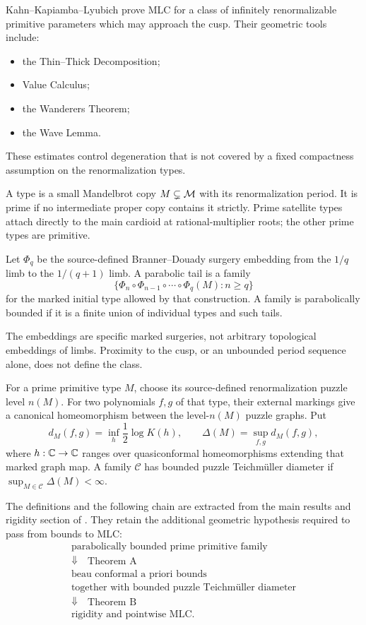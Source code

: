 Kahn--Kapiamba--Lyubich prove MLC for a class of infinitely renormalizable
primitive parameters which may approach the cusp.  Their geometric tools
include:
\begin{itemize}
\item the Thin--Thick Decomposition;
\item Value Calculus;
\item the Wanderers Theorem;
\item the Wave Lemma.
\end{itemize}
These estimates control degeneration that is not covered by a fixed
compactness assumption on the renormalization types.

\begin{definition}
A type is a small Mandelbrot copy $M\subsetneq\mathcal M$ with its
renormalization period.  It is prime if no intermediate proper copy
contains it strictly.  Prime satellite types attach directly to the
main cardioid at rational-multiplier roots; the other prime types
are primitive.

Let $\Phi_q$ be the source-defined Branner--Douady surgery embedding
from the $1/q$ limb to the $1/(q+1)$ limb.  A parabolic tail is a
family
\[
 \{\Phi_n\circ\Phi_{n-1}\circ\cdots\circ\Phi_q(M):n\ge q\}
\]
for the marked initial type allowed by that construction.
A family is parabolically bounded if it is a finite union of
individual types and such tails.
\end{definition}

The embeddings are specific marked surgeries, not arbitrary
topological embeddings of limbs.  Proximity to the cusp, or an
unbounded period sequence alone, does not define the class.

\begin{definition}
For a prime primitive type $M$, choose its source-defined
renormalization puzzle level $n(M)$.  For two polynomials $f,g$ of
that type, their external markings give a canonical homeomorphism
between the level-$n(M)$ puzzle graphs.  Put
\[
 d_M(f,g)=\inf_h\frac12\log K(h),\qquad
 \Delta(M)=\sup_{f,g}d_M(f,g),
\]
where $h:\mathbb C\to\mathbb C$ ranges over quasiconformal homeomorphisms
extending that marked graph map.  A family $\mathcal C$ has bounded
puzzle Teichmüller diameter if
$\sup_{M\in\mathcal C}\Delta(M)<\infty$.
\end{definition}

The definitions and the following chain are extracted from the main
results and rigidity section of
\cite{KahnKapiambaLyubich}.  They retain the additional geometric
hypothesis required to pass from bounds to MLC:
\[
 \begin{gathered}
 \text{parabolically bounded prime primitive family}\\
 \Downarrow\quad\text{Theorem A}\\
 \text{beau conformal a priori bounds}\\
 \text{together with bounded puzzle Teichmüller diameter}\\
 \Downarrow\quad\text{Theorem B}\\
 \text{rigidity and pointwise MLC}.
 \end{gathered}
\]

